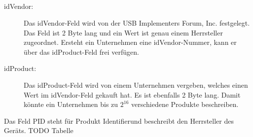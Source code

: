$ $\\ \\ \\ \\ \\
\begin{description}
	\item[idVendor: ] Das idVendor-Feld wird von der USB Implementers Forum, Inc. festgelegt. Das Feld ist 2 Byte lang und ein Wert ist genau einem Herrsteller zugeordnet. Ersteht ein Unternehmen eine idVendor-Nummer, kann er über das idProduct-Feld frei verfügen.
	\item[idProduct: ] Das idProduct-Feld wird von einem Unternehmen vergeben, welches einen Wert im idVendor-Feld gekauft hat. Es ist ebenfalls 2 Byte lang. Damit könnte ein Unternehmen bis zu $2^{16}$ verschiedene Produkte beschreiben.
	
\end{description}
Das Feld PID steht für Produkt \glqq Identifier\grqq und beschreibt den Herrsteller des Geräts. TODO Tabelle